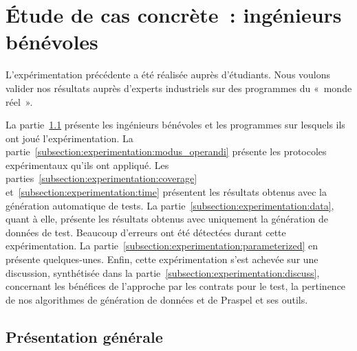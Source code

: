 \section{Étude de cas concrète~: ingénieurs bénévoles}
\label{section:experimentation:real}

L'expérimentation précédente a été réalisée auprès d'étudiants. Nous voulons
valider nos résultats auprès d'experts industriels sur des programmes du «~monde
réel~».

La partie~\ref{subsection:experimentation:presentation} présente les ingénieurs
bénévoles et les programmes sur lesquels ils ont joué l'expérimentation. La
partie~\ref{subsection:experimentation:modus_operandi} présente les protocoles
expérimentaux qu'ils ont appliqué. Les
parties~\ref{subsection:experimentation:coverage}
et~\ref{subsection:experimentation:time} présentent les résultats obtenus avec
la génération automatique de tests. La
partie~\ref{subsection:experimentation:data}, quant à elle, présente les
résultats obtenus avec uniquement la génération de données de test. Beaucoup
d'erreurs ont été détectées durant cette expérimentation. La
partie~\ref{subsection:experimentation:parameterized} en présente quelques-unes.
Enfin, cette expérimentation s'est achevée sur une discussion, synthétisée dans
la partie~\ref{subsection:experimentation:discuss}, concernant les bénéfices de
l'approche par les contrats pour le test, la pertinence de nos algorithmes de
génération de données et de Praspel et ses outils.

\subsection{Présentation générale}
\label{subsection:experimentation:presentation}

